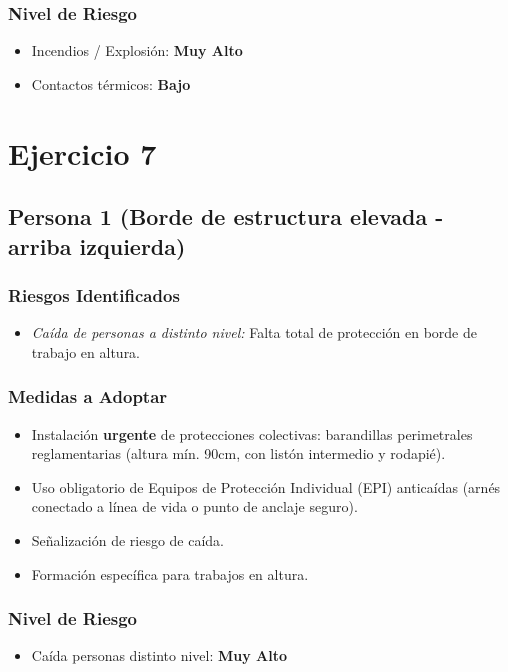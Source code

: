 \documentclass[12pt,a4paper]{article}
\begin{document}
	\subsubsection{Nivel de Riesgo}
	\begin{itemize}
		\item Incendios / Explosión: \textbf{Muy Alto}
		\item Contactos térmicos: \textbf{Bajo}
	\end{itemize}
	
	\section{Ejercicio 7}
	
	\subsection{Persona 1 (Borde de estructura elevada - arriba izquierda)}
	
	\subsubsection{Riesgos Identificados}
	\begin{itemize}
		\item \textit{Caída de personas a distinto nivel:} Falta total de protección en borde de trabajo en altura.
	\end{itemize}
	
	\subsubsection{Medidas a Adoptar}
	\begin{itemize}
		\item Instalación \textbf{urgente} de protecciones colectivas: barandillas perimetrales reglamentarias (altura mín. 90cm, con listón intermedio y rodapié).
		\item Uso obligatorio de Equipos de Protección Individual (EPI) anticaídas (arnés conectado a línea de vida o punto de anclaje seguro).
		\item Señalización de riesgo de caída.
		\item Formación específica para trabajos en altura.
	\end{itemize}
	
	\subsubsection{Nivel de Riesgo}
	\begin{itemize}
		\item Caída personas distinto nivel: \textbf{Muy Alto}
	\end{itemize}
	
\end{document}
